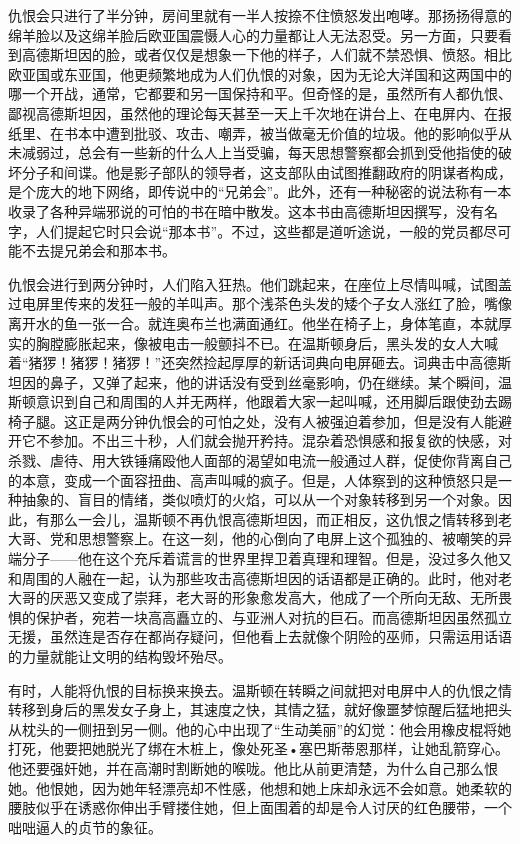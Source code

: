 仇恨会只进行了半分钟，房间里就有一半人按捺不住愤怒发出咆哮。那扬扬得意的绵羊脸以及这绵羊脸后欧亚国震慑人心的力量都让人无法忍受。另一方面，只要看到高德斯坦因的脸，或者仅仅是想象一下他的样子，人们就不禁恐惧、愤怒。相比欧亚国或东亚国，他更频繁地成为人们仇恨的对象，因为无论大洋国和这两国中的哪一个开战，通常，它都要和另一国保持和平。但奇怪的是，虽然所有人都仇恨、鄙视高德斯坦因，虽然他的理论每天甚至一天上千次地在讲台上、在电屏内、在报纸里、在书本中遭到批驳、攻击、嘲弄，被当做毫无价值的垃圾。他的影响似乎从未减弱过，总会有一些新的什么人上当受骗，每天思想警察都会抓到受他指使的破坏分子和间谍。他是影子部队的领导者，这支部队由试图推翻政府的阴谋者构成，是个庞大的地下网络，即传说中的``兄弟会''。此外，还有一种秘密的说法称有一本收录了各种异端邪说的可怕的书在暗中散发。这本书由高德斯坦因撰写，没有名字，人们提起它时只会说``那本书''。不过，这些都是道听途说，一般的党员都尽可能不去提兄弟会和那本书。

仇恨会进行到两分钟时，人们陷入狂热。他们跳起来，在座位上尽情叫喊，试图盖过电屏里传来的发狂一般的羊叫声。那个浅茶色头发的矮个子女人涨红了脸，嘴像离开水的鱼一张一合。就连奥布兰也满面通红。他坐在椅子上，身体笔直，本就厚实的胸膛膨胀起来，像被电击一般颤抖不已。在温斯顿身后，黑头发的女人大喊着``猪猡！猪猡！猪猡！''还突然捡起厚厚的新话词典向电屏砸去。词典击中高德斯坦因的鼻子，又弹了起来，他的讲话没有受到丝毫影响，仍在继续。某个瞬间，温斯顿意识到自己和周围的人并无两样，他跟着大家一起叫喊，还用脚后跟使劲去踢椅子腿。这正是两分钟仇恨会的可怕之处，没有人被强迫着参加，但是没有人能避开它不参加。不出三十秒，人们就会抛开矜持。混杂着恐惧感和报复欲的快感，对杀戮、虐待、用大铁锤痛殴他人面部的渴望如电流一般通过人群，促使你背离自己的本意，变成一个面容扭曲、高声叫喊的疯子。但是，人体察到的这种愤怒只是一种抽象的、盲目的情绪，类似喷灯的火焰，可以从一个对象转移到另一个对象。因此，有那么一会儿，温斯顿不再仇恨高德斯坦因，而正相反，这仇恨之情转移到老大哥、党和思想警察上。在这一刻，他的心倒向了电屏上这个孤独的、被嘲笑的异端分子——他在这个充斥着谎言的世界里捍卫着真理和理智。但是，没过多久他又和周围的人融在一起，认为那些攻击高德斯坦因的话语都是正确的。此时，他对老大哥的厌恶又变成了崇拜，老大哥的形象愈发高大，他成了一个所向无敌、无所畏惧的保护者，宛若一块高高矗立的、与亚洲人对抗的巨石。而高德斯坦因虽然孤立无援，虽然连是否存在都尚存疑问，但他看上去就像个阴险的巫师，只需运用话语的力量就能让文明的结构毁坏殆尽。

有时，人能将仇恨的目标换来换去。温斯顿在转瞬之间就把对电屏中人的仇恨之情转移到身后的黑发女子身上，其速度之快，其情之猛，就好像噩梦惊醒后猛地把头从枕头的一侧扭到另一侧。他的心中出现了``生动美丽''的幻觉：他会用橡皮棍将她打死，他要把她脱光了绑在木桩上，像处死圣•塞巴斯蒂恩那样，让她乱箭穿心。他还要强奸她，并在高潮时割断她的喉咙。他比从前更清楚，为什么自己那么恨她。他恨她，因为她年轻漂亮却不性感，他想和她上床却永远不会如意。她柔软的腰肢似乎在诱惑你伸出手臂搂住她，但上面围着的却是令人讨厌的红色腰带，一个咄咄逼人的贞节的象征。

